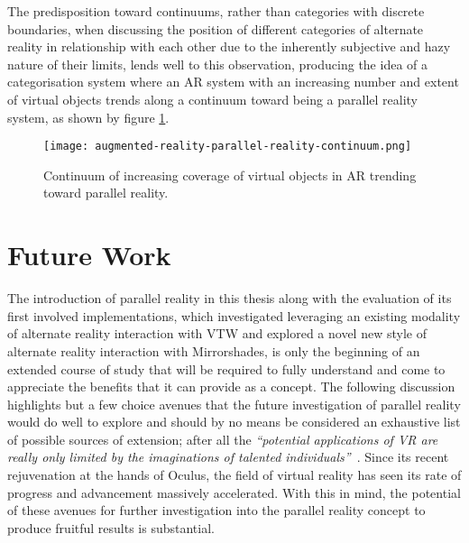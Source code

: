 The predisposition toward continuums, rather than categories with discrete boundaries, when discussing the position of different categories of alternate reality in relationship with each other due to the inherently subjective and hazy nature of their limits, lends well to this observation, producing the idea of a categorisation system where an AR system with an increasing number and extent of virtual objects trends along a continuum toward being a parallel reality system, as shown by figure \ref{augmented-reality-parallel-reality-continuum.png}.

\begin{figure}[h]
	\begin{center}
		\texttt{[image: augmented-reality-parallel-reality-continuum.png]}
		\caption{Continuum of increasing coverage of virtual objects in AR trending toward parallel reality.}
		\label{augmented-reality-parallel-reality-continuum.png}
	\end{center}	
\end{figure}



\section{Future Work}

The introduction of parallel reality in this thesis along with the evaluation of its first involved implementations, which investigated leveraging an existing modality of alternate reality interaction with VTW and explored a novel new style of alternate reality interaction with Mirrorshades, is only the beginning of an extended course of study that will be required to fully understand and come to appreciate the benefits that it can provide as a concept. The following discussion highlights but a few choice avenues that the future investigation of parallel reality would do well to explore and should by no means be considered an exhaustive list of possible sources of extension; after all the \textit{``potential applications of VR are really only limited by the imaginations of talented individuals''}~\cite{Giuseppe2014a}. Since its recent rejuvenation at the hands of Oculus, the field of virtual reality has seen its rate of progress and advancement massively accelerated. With this in mind, the potential of these avenues for further investigation into the parallel reality concept to produce fruitful results is substantial.

